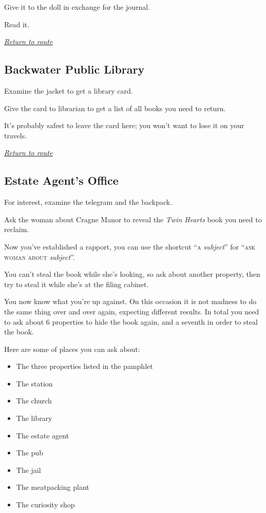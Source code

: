 \documentclass[a5paper]{extarticle}
\begin{document}
Give it to the doll in exchange for the journal.

Read it.

\hyperref[sec:route-1]{\emph{Return to route}}

\newpage
\subsection{Backwater Public Library}\label{sec:sol-Public-Library-0}

Examine the jacket to get a library card.

Give the card to librarian to get a list of all books you need to return.

It's probably safest to leave the card here; you won't want to lose it on your
travels.

\hyperref[sec:route-1]{\emph{Return to route}}

\newpage
\subsection{Estate Agent's Office}\label{sec:sol-Estate-Agent's-Office}

For interest, examine the telegram and the backpack.

Ask the woman about Cragne Manor to reveal the \emph{Twin Hearts} book you need to reclaim.

Now you've established a rapport, you can use the shortcut \enquote{\textsc{a}
\emph{subject}} for \enquote{\textsc{ask woman about} \emph{subject}}.

You can't steal the book while she's looking, so ask about another property,
then try to steal it while she's at the filing cabinet.

You now know what you're up against. On this occasion it is not madness to do
the same thing over and over again, expecting different results.
In total you need to ask about 6 properties to hide the book again,
and a seventh in order to steal the book.

Here are some of places you can ask about:

\begin{multicols}{2}
\begin{itemize}
\item The three properties listed in the pamphlet
\item The station
\item The church
\item The library
\item The estate agent
\item The pub
\item The jail
\item The meatpacking plant
\item The curiosity shop
\end{itemize}
\end{multicols}
\end{document}

